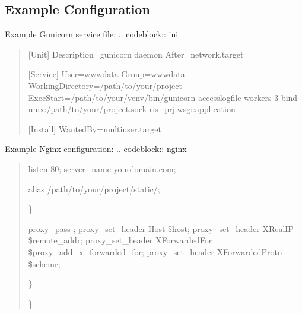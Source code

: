 \documentclass[letterpaper,10pt,english]{sphinxmanual}
\begin{document}
\subsection{Example Configuration}
\label{\detokenize{deployment/index:example-configuration}}
\sphinxAtStartPar
Example Gunicorn service file:
.. code\sphinxhyphen{}block:: ini
\begin{quote}

\sphinxAtStartPar
{[}Unit{]}
Description=gunicorn daemon
After=network.target

\sphinxAtStartPar
{[}Service{]}
User=www\sphinxhyphen{}data
Group=www\sphinxhyphen{}data
WorkingDirectory=/path/to/your/project
ExecStart=/path/to/your/venv/bin/gunicorn \textendash{}access\sphinxhyphen{}logfile \sphinxhyphen{} \textendash{}workers 3 \textendash{}bind unix:/path/to/your/project.sock ris\_prj.wsgi:application

\sphinxAtStartPar
{[}Install{]}
WantedBy=multi\sphinxhyphen{}user.target
\end{quote}

\sphinxAtStartPar
Example Nginx configuration:
.. code\sphinxhyphen{}block:: nginx
\begin{quote}
\begin{description}
\sphinxAtStartPar
listen 80;
server\_name your\sphinxhyphen{}domain.com;
\begin{description}
\sphinxAtStartPar
alias /path/to/your/project/static/;

\end{description}

\sphinxAtStartPar
\}
\begin{description}
\sphinxAtStartPar
proxy\_pass ;
proxy\_set\_header Host \$host;
proxy\_set\_header X\sphinxhyphen{}Real\sphinxhyphen{}IP \$remote\_addr;
proxy\_set\_header X\sphinxhyphen{}Forwarded\sphinxhyphen{}For \$proxy\_add\_x\_forwarded\_for;
proxy\_set\_header X\sphinxhyphen{}Forwarded\sphinxhyphen{}Proto \$scheme;

\end{description}

\sphinxAtStartPar
\}

\end{description}

\sphinxAtStartPar
\}
\end{quote}

\sphinxstepscope
\end{document}
